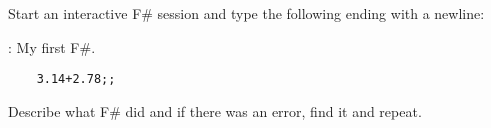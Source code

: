 \label{ex:interactiveSession} Start an interactive F\# session and type the following ending with a newline:
\begin{codeNOutput}{: My first F\#.}
  \begin{lstlisting}
    3.14+2.78;;
  \end{lstlisting}
\end{codeNOutput}
Describe what F\# did and if there was an error, find it and repeat.
